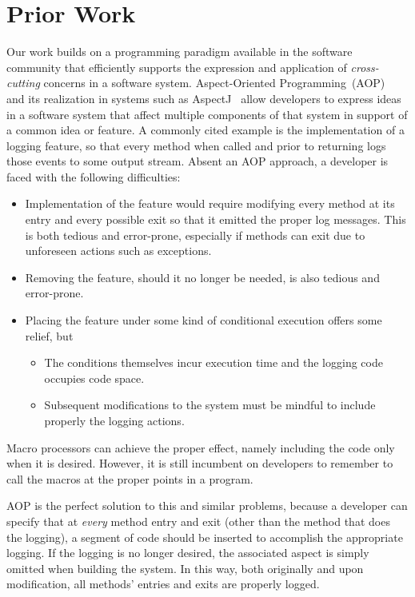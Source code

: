 \documentclass[sigplan,anonymous,review]{acmart}
\begin{document}
\section{Prior Work}\label{sec:prior}

Our work builds on a programming paradigm available in the software community that efficiently supports the expression and application of \emph{cross-cutting} concerns in a software system.  Aspect-Oriented Programming~(AOP)~\cite{Kicz97} and its realization in systems such as AspectJ~\cite{aspectj} allow developers to express ideas in a software system that affect multiple components of that system in support of a common idea or feature.   A commonly cited example is the implementation of a logging feature, so that every method when called and prior to returning logs those events to some output stream.   Absent an AOP approach, a developer is faced with the following difficulties:
\begin{itemize}
    \item Implementation of the feature would require modifying every method at its entry and every possible exit so that it emitted the proper log messages.  This is both tedious and error-prone, especially if methods can exit due to unforeseen actions such as exceptions.
    \item Removing the feature, should it no longer be needed, is also tedious and error-prone.
    \item Placing the feature under some kind of conditional execution offers some relief, but
    \begin{itemize}
        \item The conditions themselves incur execution time and the logging code occupies code space.
        \item Subsequent modifications to the system must be mindful to include properly the logging actions.
    \end{itemize}
\end{itemize}
Macro processors can achieve the proper effect, namely including the code only when it is desired.  However, it is still incumbent on developers to remember to call the macros at the proper points in a program.

AOP is the perfect solution to this and similar problems, because a developer can specify that at \emph{every} method entry and exit (other than the method that does the logging), a segment of code should be inserted to accomplish the appropriate logging.  If the logging is no longer desired, the associated aspect is simply omitted when building the system.  In this way, both originally and upon modification, all methods' entries and exits are properly logged.
\end{document}
